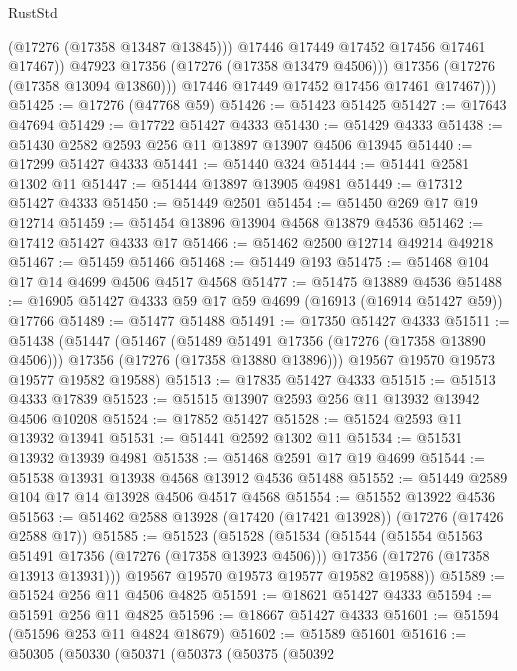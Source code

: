 \begin{lexlean}{RustStd}
\begin{coremodule}
                    (@17276 (@17358 @13487 @13845)))
                  @17446
                  @17449
                  @17452
                  @17456
                  @17461
                  @17467))
              @47923
              @17356
              (@17276 (@17358 @13479 @4506)))
            @17356
            (@17276 (@17358 @13094 @13860)))
          @17446
          @17449
          @17452
          @17456
          @17461
          @17467)))
@51425 := @17276 (@47768 @59)
@51426 := @51423 @51425
@51427 := @17643 @47694
@51429 := @17722 @51427 @4333
@51430 := @51429 @4333
@51438 := @51430 @2582 @2593 @256 @11 @13897 @13907 @4506 @13945
@51440 := @17299 @51427 @4333
@51441 := @51440 @324
@51444 := @51441 @2581 @1302 @11
@51447 := @51444 @13897 @13905 @4981
@51449 := @17312 @51427 @4333
@51450 := @51449 @2501
@51454 := @51450 @269 @17 @19 @12714
@51459 := @51454 @13896 @13904 @4568 @13879 @4536
@51462 := @17412 @51427 @4333 @17
@51466 := @51462 @2500 @12714 @49214 @49218
@51467 := @51459 @51466
@51468 := @51449 @193
@51475 := @51468 @104 @17 @14 @4699 @4506 @4517 @4568
@51477 := @51475 @13889 @4536
@51488 := @16905 @51427 @4333 @59 @17 @59 @4699 (@16913 (@16914 @51427 @59)) @17766
@51489 := @51477 @51488
@51491 := @17350 @51427 @4333
@51511 := @51438
    (@51447
      (@51467
        (@51489 @51491 @17356 (@17276 (@17358 @13890 @4506)))
        @17356
        (@17276 (@17358 @13880 @13896)))
      @19567
      @19570
      @19573
      @19577
      @19582
      @19588)
@51513 := @17835 @51427 @4333
@51515 := @51513 @4333 @17839
@51523 := @51515 @13907 @2593 @256 @11 @13932 @13942 @4506 @10208
@51524 := @17852 @51427
@51528 := @51524 @2593 @11 @13932 @13941
@51531 := @51441 @2592 @1302 @11
@51534 := @51531 @13932 @13939 @4981
@51538 := @51468 @2591 @17 @19 @4699
@51544 := @51538 @13931 @13938 @4568 @13912 @4536 @51488
@51552 := @51449 @2589 @104 @17 @14 @13928 @4506 @4517 @4568
@51554 := @51552 @13922 @4536
@51563 := @51462 @2588 @13928 (@17420 (@17421 @13928)) (@17276 (@17426 @2588 @17))
@51585 := @51523
    (@51528
      (@51534
        (@51544
          (@51554 @51563 @51491 @17356 (@17276 (@17358 @13923 @4506)))
          @17356
          (@17276 (@17358 @13913 @13931)))
        @19567
        @19570
        @19573
        @19577
        @19582
        @19588))
@51589 := @51524 @256 @11 @4506 @4825
@51591 := @18621 @51427 @4333
@51594 := @51591 @256 @11 @4825
@51596 := @18667 @51427 @4333
@51601 := @51594 (@51596 @253 @11 @4824 @18679)
@51602 := @51589 @51601
@51616 := @50305
    (@50330
      (@50371
        (@50373
          (@50375
            (@50392

\end{coremodule}
\end{lexlean}
